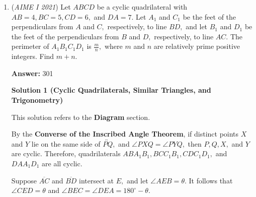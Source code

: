 \begin{enumerate}
 \textbf{<u>Remark</u>}

 Alternatively, from $(*)$ we can set 
 \[\frac{m+18k'}{m+1+19k'}=\frac{t}{t+1}.\]We cross-multiply, rearrange, and apply Simon's Favorite Factoring Trick to get 
 \[\left(k'+1\right)(t-18)=m-18.\]Since $k'+1\geq2,$ to find the smallest $k',$ we need $k'+1$ to be the smallest prime factor of $m-18.$ Now we continue with the last two paragraphs of the solution above.

 


	\item (\textit{AIME I 2021}) Let $ABCD$ be a cyclic quadrilateral with $AB=4,BC=5,CD=6,$ and $DA=7.$ Let $A_1$ and $C_1$ be the feet of the perpendiculars from $A$ and $C,$ respectively, to line $BD,$ and let $B_1$ and $D_1$ be the feet of the perpendiculars from $B$ and $D,$ respectively, to line $AC.$ The perimeter of $A_1B_1C_1D_1$ is $\frac mn,$ where $m$ and $n$ are relatively prime positive integers. Find $m+n.$

 \textbf{Answer: }301



\textbf{Solution 1 (Cyclic Quadrilaterals, Similar Triangles, and Trigonometry)}

This solution refers to the \textbf{Diagram} section.

 By the \textbf{Converse of the Inscribed Angle Theorem}, if distinct points $X$ and $Y$ lie on the same side of $\overleftrightarrow{PQ},$ and $\angle PXQ=\angle PYQ,$ then $P,Q,X,$ and $Y$ are cyclic. Therefore, quadrilaterals $ABA_1B_1,BCC_1B_1,CDC_1D_1,$ and $DAA_1D_1$ are all cyclic.

 Suppose $\overline{AC}$ and $\overline{BD}$ intersect at $E,$ and let $\angle AEB=\theta.$ It follows that $\angle CED=\theta$ and $\angle BEC=\angle DEA=180^\circ-\theta.$


\end{enumerate}

